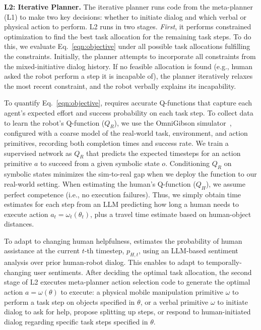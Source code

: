 \textbf{L2: Iterative Planner.} 
The iterative planner runs code from the meta-planner (L1) to make two key decisions: whether to initiate dialog and which verbal or physical action to perform. L2 runs in two stages. \textit{First}, it performs constrained optimization to find the best task allocation for the remaining task steps. To do this, we evaluate Eq.~\ref{eqn:objective}  under all possible task allocations fulfilling the constraints. Initially, the planner attempts to incorporate all constraints from the mixed-initiative dialog history. If no feasible allocation is found (e.g., human asked the robot perform a step it is incapable of), the planner iteratively relaxes the most recent constraint, and the robot verbally explains its incapability.

To quantify Eq.~\ref{eqn:objective}, \methodname{} requires accurate Q-functions that capture each agent’s expected effort and success probability on each task step. To collect data to learn the robot's Q-function ($Q_R$), we use the OmniGibson simulator~\cite{li2022behavior}, configured with a coarse model of the real-world task, environment,
and action primitives, recording both completion times and success rate. 
We train a supervised network as $Q_R$ that predicts the expected timesteps for an action primitive $a$ to succeed from a given symbolic state $o$.
Conditioning $Q_R$ on symbolic states minimizes the sim-to-real gap when we deploy the function to our real-world setting. When estimating the human's Q-function ($Q_H$), we assume perfect competence (i.e., no execution failures).
Thus, we simply obtain time estimates for each step from an LLM predicting how long a human needs to execute action $a_t = \omega_t(\theta_t)$, plus a travel time estimate based on human-object distances.%

To adapt to changing human helpfulness, \ours{} estimates the probability of human assistance at the current $t$-th timestep, $p_{H,t}$, using an LLM-based sentiment analysis over prior human-robot dialog. This enables \methodname{} to adapt to temporally-changing user sentiments. %
After deciding the optimal task allocation, the second stage of L2 executes meta-planner action selection code to generate the optimal action $a = \omega(\theta)$ to execute: a physical mobile manipulation primitive $\omega$ to perform a task step on objects specified in $\theta$, or a verbal primitive $\omega$ to initiate dialog to ask for help, propose splitting up steps, or respond to human-initiated dialog regarding specific task steps specified in $\theta$.

